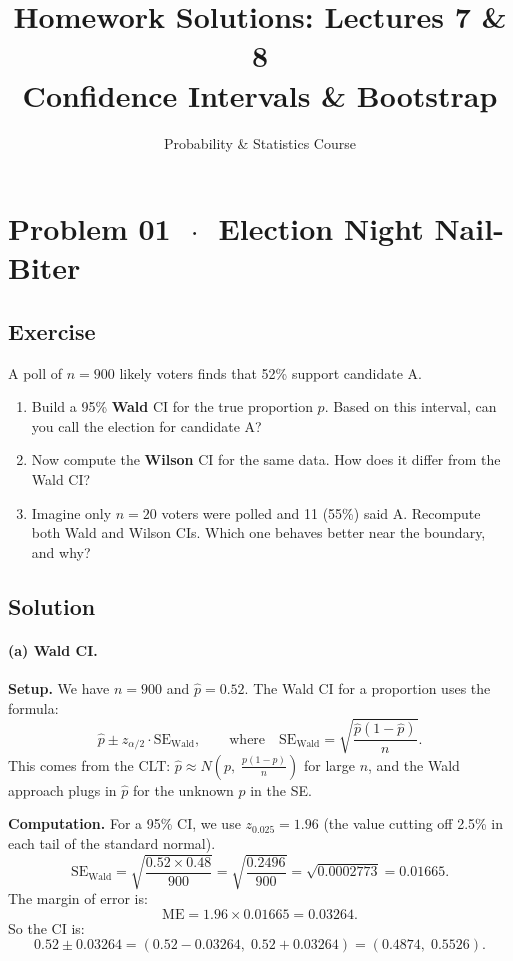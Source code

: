\documentclass[11pt]{article}
\title{Homework Solutions: Lectures 7 \& 8\\[4pt]
\large Confidence Intervals \& Bootstrap}
\author{Probability \& Statistics Course}
\date{}
\newcommand{\phat}{\hat{p}}
\begin{document}
\maketitle

\section*{Problem 01 \texorpdfstring{$\,\cdot\,$}{-} Election Night Nail-Biter}

\subsection*{Exercise}

A poll of $n = 900$ likely voters finds that 52\% support candidate A.

\begin{enumerate}[label=\alph*)]
  \item Build a 95\% \textbf{Wald} CI for the true proportion $p$. Based on this interval, can you call the election for candidate A?
  \item Now compute the \textbf{Wilson} CI for the same data. How does it differ from the Wald CI?
  \item Imagine only $n = 20$ voters were polled and 11 (55\%) said A. Recompute both Wald and Wilson CIs. Which one behaves better near the boundary, and why?
\end{enumerate}

\subsection*{Solution}

\paragraph{(a) Wald CI.}

\textbf{Setup.} We have $n = 900$ and $\phat = 0.52$. The Wald CI for a proportion uses the formula:
\[
  \phat \pm z_{\alpha/2} \cdot \text{SE}_{\text{Wald}},
  \qquad \text{where} \quad
  \text{SE}_{\text{Wald}} = \sqrt{\frac{\phat(1-\phat)}{n}}.
\]
This comes from the CLT: $\phat \approx N\!\left(p,\; \frac{p(1-p)}{n}\right)$ for large $n$, and the Wald approach plugs in $\phat$ for the unknown $p$ in the SE.

\textbf{Computation.} For a 95\% CI, we use $z_{0.025} = 1.96$ (the value cutting off 2.5\% in each tail of the standard normal).
\[
  \text{SE}_{\text{Wald}} = \sqrt{\frac{0.52 \times 0.48}{900}}
  = \sqrt{\frac{0.2496}{900}}
  = \sqrt{0.0002773}
  = 0.01665.
\]
The margin of error is:
\[
  \text{ME} = 1.96 \times 0.01665 = 0.03264.
\]
So the CI is:
\[
  0.52 \pm 0.03264 = (0.52 - 0.03264,\; 0.52 + 0.03264) = \boxed{(0.4874,\; 0.5526)}.
\]
\end{document}
